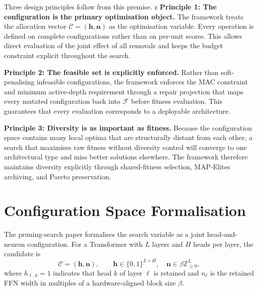 Three design principles follow from this premise.
z
\medskip\noindent\textbf{Principle 1: The configuration is the primary optimisation object.} The framework treats the allocation vector $\mathcal{C} = (\mathbf{h}, \mathbf{n})$ as the optimisation variable. Every operation is defined on complete configurations rather than on per-unit scores. This allows direct evaluation of the joint effect of all removals and keeps the budget constraint explicit throughout the search.

\medskip\noindent\textbf{Principle 2: The feasible set is explicitly enforced.} Rather than soft-penalising infeasible configurations, the framework enforces the MAC constraint and minimum active-depth requirement through a repair projection that maps every mutated configuration back into $\mathcal{F}$ before fitness evaluation. This guarantees that every evaluation corresponds to a deployable architecture.

\medskip\noindent\textbf{Principle 3: Diversity is as important as fitness.} Because the configuration space contains many local optima that are structurally distant from each other, a search that maximises raw fitness without diversity control will converge to one architectural type and miss better solutions elsewhere. The framework therefore maintains diversity explicitly through shared-fitness selection, MAP-Elites archiving, and Pareto preservation.

\section{Configuration Space Formalisation}
\label{subsec:config_space}

The pruning-search paper formalises the search variable as a joint head-and-neuron configuration. For a Transformer with $L$ layers and $H$ heads per layer, the candidate is
\begin{equation}
  \mathcal{C} = (\mathbf{h}, \mathbf{n}), \qquad
  \mathbf{h} \in \{0,1\}^{L \times H}, \quad
  \mathbf{n} \in \beta \mathbb{Z}_{\ge 0}^{L},
  \label{eq:design_candidate}
\end{equation}
where $h_{\ell,k}=1$ indicates that head $k$ of layer $\ell$ is retained and $n_\ell$ is the retained FFN width in multiples of a hardware-aligned block size $\beta$.

